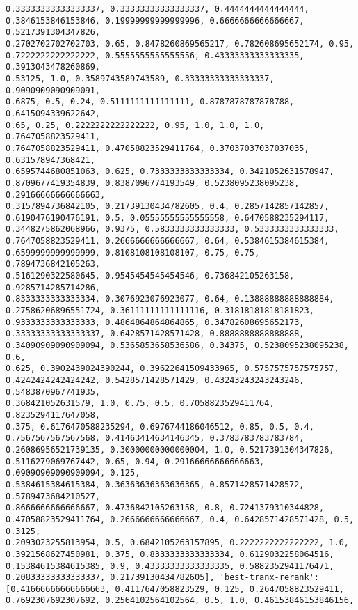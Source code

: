 \documentclass[11pt]{article}
\begin{document}
\begin{Verbatim}[commandchars=\\\{\}]
0.33333333333333337, 0.33333333333333337, 0.4444444444444444,
0.3846153846153846, 0.19999999999999996, 0.6666666666666667, 0.5217391304347826,
0.2702702702702703, 0.65, 0.8478260869565217, 0.782608695652174, 0.95,
0.7222222222222222, 0.5555555555555556, 0.43333333333333335, 0.3913043478260869,
0.53125, 1.0, 0.3589743589743589, 0.33333333333333337, 0.9090909090909091,
0.6875, 0.5, 0.24, 0.5111111111111111, 0.8787878787878788, 0.6415094339622642,
0.65, 0.25, 0.2222222222222222, 0.95, 1.0, 1.0, 1.0, 0.7647058823529411,
0.7647058823529411, 0.47058823529411764, 0.37037037037037035, 0.631578947368421,
0.6595744680851063, 0.625, 0.7333333333333334, 0.3421052631578947,
0.8709677419354839, 0.8387096774193549, 0.5238095238095238, 0.29166666666666663,
0.3157894736842105, 0.21739130434782605, 0.4, 0.2857142857142857,
0.6190476190476191, 0.5, 0.05555555555555558, 0.6470588235294117,
0.3448275862068966, 0.9375, 0.5833333333333333, 0.5333333333333333,
0.7647058823529411, 0.2666666666666667, 0.64, 0.5384615384615384,
0.6599999999999999, 0.8108108108108107, 0.75, 0.75, 0.7894736842105263,
0.5161290322580645, 0.9545454545454546, 0.736842105263158, 0.9285714285714286,
0.8333333333333334, 0.3076923076923077, 0.64, 0.13888888888888884,
0.27586206896551724, 0.36111111111111116, 0.31818181818181823,
0.9333333333333333, 0.4864864864864865, 0.34782608695652173,
0.33333333333333337, 0.6428571428571428, 0.8888888888888888,
0.34090909090909094, 0.5365853658536586, 0.34375, 0.5238095238095238, 0.6,
0.625, 0.3902439024390244, 0.39622641509433965, 0.5757575757575757,
0.4242424242424242, 0.5428571428571429, 0.43243243243243246, 0.5483870967741935,
0.368421052631579, 1.0, 0.75, 0.5, 0.7058823529411764, 0.8235294117647058,
0.375, 0.6176470588235294, 0.6976744186046512, 0.85, 0.5, 0.4,
0.7567567567567568, 0.41463414634146345, 0.3783783783783784,
0.26086956521739135, 0.30000000000000004, 1.0, 0.5217391304347826,
0.5116279069767442, 0.65, 0.94, 0.29166666666666663, 0.09090909090909094, 0.125,
0.5384615384615384, 0.36363636363636365, 0.8571428571428572, 0.5789473684210527,
0.8666666666666667, 0.4736842105263158, 0.8, 0.7241379310344828,
0.47058823529411764, 0.2666666666666667, 0.4, 0.6428571428571428, 0.5, 0.3125,
0.2093023255813954, 0.5, 0.6842105263157895, 0.2222222222222222, 1.0,
0.3921568627450981, 0.375, 0.8333333333333334, 0.6129032258064516,
0.15384615384615385, 0.9, 0.43333333333333335, 0.5882352941176471,
0.20833333333333337, 0.21739130434782605], 'best-tranx-rerank':
[0.41666666666666663, 0.4117647058823529, 0.125, 0.2647058823529411,
0.7692307692307692, 0.2564102564102564, 0.5, 1.0, 0.46153846153846156,

\end{Verbatim}
\end{document}
